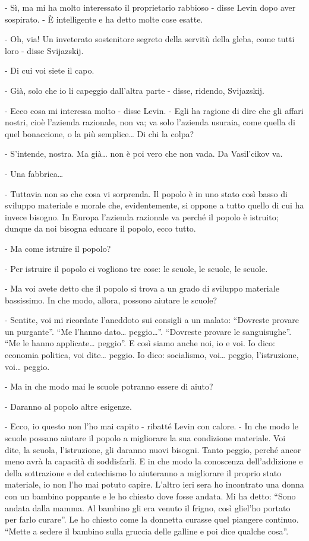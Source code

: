 - Sì, ma mi ha molto interessato il proprietario rabbioso - disse Levin dopo aver sospirato. - È intelligente e ha detto molte cose esatte. 

- Oh, via! Un inveterato sostenitore segreto della servitù della gleba, come tutti loro - disse Svijazskij. 

- Di cui voi siete il capo. 

- Già, solo che io li capeggio dall'altra parte - disse, ridendo, Svijazskij. 

- Ecco cosa mi interessa molto - disse Levin. - Egli ha ragione di dire che gli affari nostri, cioè l'azienda razionale, non va; va solo l'azienda usuraia, come quella di quel bonaccione, o la più semplice\ldots{} Di chi la colpa? 

- S'intende, nostra. Ma già\ldots{} non è poi vero che non vada. Da Vasil'cikov va. 

- Una fabbrica\ldots{} 

- Tuttavia non so che cosa vi sorprenda. Il popolo è in uno stato così basso di sviluppo materiale e morale che, evidentemente, si oppone a tutto quello di cui ha invece bisogno. In Europa l'azienda razionale va perché il popolo è istruito; dunque da noi bisogna educare il popolo, ecco tutto. 

- Ma come istruire il popolo? 

- Per istruire il popolo ci vogliono tre cose: le scuole, le scuole, le scuole. 

- Ma voi avete detto che il popolo si trova a un grado di sviluppo materiale bassissimo. In che modo, allora, possono aiutare le scuole? 

- Sentite, voi mi ricordate l'aneddoto sui consigli a un malato: ``Dovreste provare un purgante''. ``Me l'hanno dato\ldots{} peggio\ldots{}''. ``Dovreste provare le sanguisughe''. ``Me le hanno applicate\ldots{} peggio''. E così siamo anche noi, io e voi. Io dico: economia politica, voi dite\ldots{} peggio. Io dico: socialismo, voi\ldots{} peggio, l'istruzione, voi\ldots{} peggio. 

- Ma in che modo mai le scuole potranno essere di aiuto? 

- Daranno al popolo altre esigenze. 

- Ecco, io questo non l'ho mai capito - ribatté Levin con calore. - In che modo le scuole possano aiutare il popolo a migliorare la sua condizione materiale. Voi dite, la scuola, l'istruzione, gli daranno nuovi bisogni. Tanto peggio, perché ancor meno avrà la capacità di soddisfarli. E in che modo la conoscenza dell'addizione e della sottrazione e del catechismo lo aiuteranno a migliorare il proprio stato materiale, io non l'ho mai potuto capire. L'altro ieri sera ho incontrato una donna con un bambino poppante e le ho chiesto dove fosse andata. Mi ha detto: ``Sono andata dalla mamma. Al bambino gli era venuto il frigno, così gliel'ho portato per farlo curare''. Le ho chiesto come la donnetta curasse quel piangere continuo. ``Mette a sedere il bambino sulla gruccia delle galline e poi dice qualche cosa''. 

